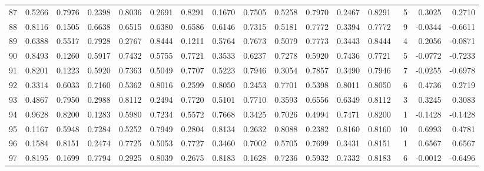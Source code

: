 \begin{tabular}{lrrrrrrrrrrrrrrr}
87  &      0.5266 &  0.7976 &  0.2398 &  0.8036 &  0.2691 &  0.8291 &  0.1670 &  0.7505 &  0.5258 &  0.7970 &   0.2467 &     0.8291 &      5 &                    0.3025 &                     0.2710 \\
88  &      0.8116 &  0.1505 &  0.6638 &  0.6515 &  0.6380 &  0.6586 &  0.6146 &  0.7315 &  0.5181 &  0.7772 &   0.3394 &     0.7772 &      9 &                   -0.0344 &                    -0.6611 \\
89  &      0.6388 &  0.5517 &  0.7928 &  0.2767 &  0.8444 &  0.1211 &  0.5764 &  0.7673 &  0.5079 &  0.7773 &   0.3443 &     0.8444 &      4 &                    0.2056 &                    -0.0871 \\
90  &      0.8493 &  0.1260 &  0.5917 &  0.7432 &  0.5755 &  0.7721 &  0.3533 &  0.6237 &  0.7278 &  0.5920 &   0.7436 &     0.7721 &      5 &                   -0.0772 &                    -0.7233 \\
91  &      0.8201 &  0.1223 &  0.5920 &  0.7363 &  0.5049 &  0.7707 &  0.5223 &  0.7946 &  0.3054 &  0.7857 &   0.3490 &     0.7946 &      7 &                   -0.0255 &                    -0.6978 \\
92  &      0.3314 &  0.6033 &  0.7160 &  0.5362 &  0.8016 &  0.2599 &  0.8050 &  0.2453 &  0.7701 &  0.5398 &   0.8011 &     0.8050 &      6 &                    0.4736 &                     0.2719 \\
93  &      0.4867 &  0.7950 &  0.2988 &  0.8112 &  0.2494 &  0.7720 &  0.5101 &  0.7710 &  0.3593 &  0.6556 &   0.6349 &     0.8112 &      3 &                    0.3245 &                     0.3083 \\
94  &      0.9628 &  0.8200 &  0.1283 &  0.5980 &  0.7234 &  0.5572 &  0.7668 &  0.3425 &  0.7026 &  0.4994 &   0.7471 &     0.8200 &      1 &                   -0.1428 &                    -0.1428 \\
95  &      0.1167 &  0.5948 &  0.7284 &  0.5252 &  0.7949 &  0.2804 &  0.8134 &  0.2632 &  0.8088 &  0.2382 &   0.8160 &     0.8160 &     10 &                    0.6993 &                     0.4781 \\
96  &      0.1584 &  0.8151 &  0.2474 &  0.7725 &  0.5053 &  0.7727 &  0.3460 &  0.7002 &  0.5705 &  0.7699 &   0.3431 &     0.8151 &      1 &                    0.6567 &                     0.6567 \\
97  &      0.8195 &  0.1699 &  0.7794 &  0.2925 &  0.8039 &  0.2675 &  0.8183 &  0.1628 &  0.7236 &  0.5932 &   0.7332 &     0.8183 &      6 &                   -0.0012 &                    -0.6496 \\

\end{tabular}
